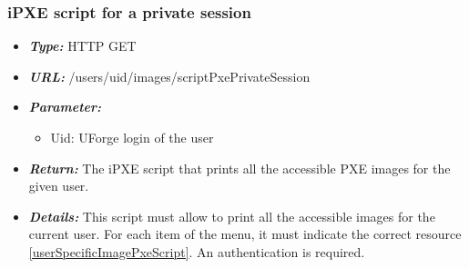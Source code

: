 \documentclass[12pt]{article}											%
\begin{document}

	\subsubsection{iPXE script for a private session} \label{privateSessionScript}
		\begin{itemize}
			\item \textbf{\textit{Type:}} HTTP GET
			\item \textbf{\textit{URL:}} /users/{uid}/images/scriptPxePrivateSession
			\item \textbf{\textit{Parameter:}}
				\begin{itemize}
					\item Uid: UForge login of the user
				\end{itemize}
			\item \textbf{\textit{Return:}} The iPXE script that prints all the accessible PXE images for the given user.
			\item \textbf{\textit{Details:}} This script must allow to print all the accessible images for the current user.   For each item of the menu, it must indicate the correct resource \ref{userSpecificImagePxeScript}.   An authentication is required.
		\end{itemize}
\end{document}
